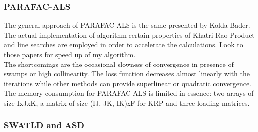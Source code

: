 \documentclass[10pt, draft]{article}
\begin{document}
 \subsubsection{PARAFAC-ALS}
 The general approach of PARAFAC-ALS is the same presented by Kolda-Bader.  The actual implementation of algorithm  certain properties of Khatri-Rao Product and line searches are employed in order to accelerate the calculations. Look to those papers for speed up of my algorithm.\\
 The shortcomings are the occasional slowness of convergence in presence of swamps or high collinearity.  The loss function decreases almost linearly with the iterations while other methods can provide superlinear or quadratic convergence.  \\
 The memory consumption for PARAFAC-ALS is limited in essence: two arrays of size IxJxK, a matrix of size (IJ, JK, IK)xF for KRP and three loading matrices.
 
 \subsubsection{SWATLD and ASD}
 
\end{document}

